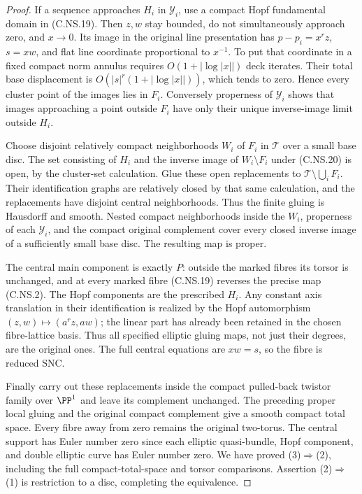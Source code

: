 \begin{proof}
If a sequence approaches $H_i$ in
$\mathcal Y_i$, use a compact Hopf
fundamental domain in (C.NS.19).
Then $z,w$ stay bounded, do not
simultaneously approach zero, and
$x\to0$. Its image in the original
line presentation has
$p-p_i=x^rz$, $s=xw$, and flat
line coordinate proportional to $x^{-1}$.
To put that coordinate in a fixed
compact norm annulus requires
$O(1+|\log|x||)$ deck iterates.
Their total base displacement is
$O(|s|^r(1+|\log|x||))$, which
tends to zero. Hence every cluster
point of the images lies in $F_i$.
Conversely properness of $\mathcal Y_i$
shows that images approaching a point
outside $F_i$ have only their unique
inverse-image limit outside $H_i$.

Choose disjoint relatively compact
neighborhoods $W_i$ of $F_i$ in
$\mathcal T$ over a small base disc.
The set consisting of $H_i$ and the
inverse image of $W_i\setminus F_i$
under (C.NS.20) is open, by the
cluster-set calculation. Glue these
open replacements to
$\mathcal T\setminus\bigcup_i F_i$.
Their identification graphs are
relatively closed by that same
calculation, and the replacements
have disjoint central neighborhoods.
Thus the finite gluing is Hausdorff
and smooth. Nested compact
neighborhoods inside the $W_i$,
properness of each $\mathcal Y_i$,
and the compact original complement
cover every closed inverse image
of a sufficiently small base disc.
The resulting map is proper.

The central main component is exactly
$P$: outside the marked fibres its
torsor is unchanged, and at every
marked fibre (C.NS.19) reverses
the precise map (C.NS.2).
The Hopf components are the prescribed
$H_i$. Any constant axis translation
in their identification is realized
by the Hopf automorphism
$(z,w)\mapsto(a^rz,aw)$; the linear
part has already been retained in
the chosen fibre-lattice basis.
Thus all specified elliptic gluing
maps, not just their degrees, are
the original ones. The full central
equations are $xw=s$, so the fibre
is reduced SNC.

Finally carry out these replacements
inside the compact pulled-back
twistor family over $\PP^1$ and
leave its complement unchanged.
The preceding proper local gluing
and the original compact complement
give a smooth compact total space.
Every fibre away from zero remains
the original two-torus. The central
support has Euler number zero since
each elliptic quasi-bundle, Hopf
component, and double elliptic curve
has Euler number zero. We have
proved (3)$\Rightarrow$(2), including
the full compact-total-space and
torsor comparisons. Assertion
(2)$\Rightarrow$(1) is restriction
to a disc, completing the equivalence.
\end{proof}
